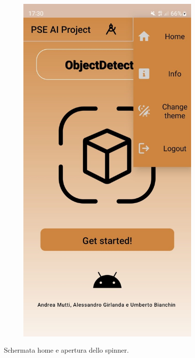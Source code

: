 \begin{figure}[ht]
\begin{subfigure}[b]{0.3\textwidth}
    \end{subfigure}
    \begin{subfigure}[b]{0.3\textwidth}
      \includegraphics[width=\textwidth, height=0.45\textheight]{Immagini/App/home_spinner_chiaro.jpeg}
    \end{subfigure}
    \caption{Schermata home e apertura dello spinner.}
    \label{fig:home}
\end{figure}


